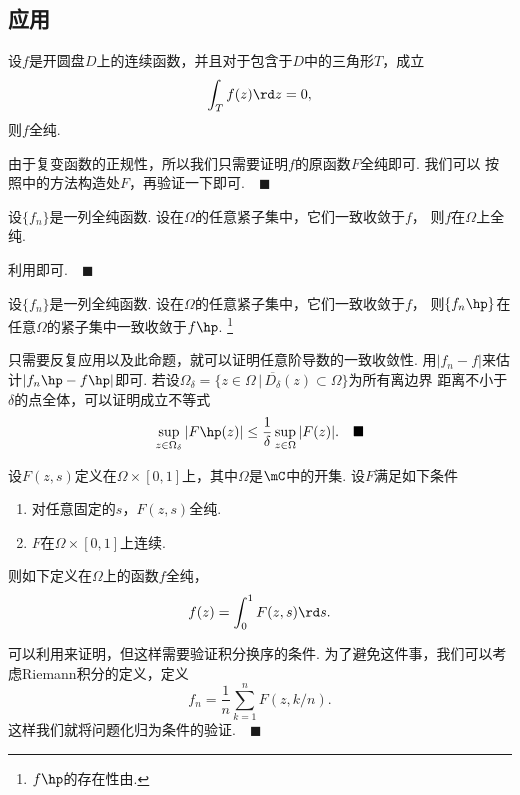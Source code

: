 \subsection{应用}

  \begin{thm}[Morera]
    \label{thm: Morera}
    设$f$是开圆盘$D$上的连续函数，并且对于包含于$D$中的三角形$T$，成立
    \[
      \int_T f(z)\rd z = 0,
    \]
    则$f$全纯.
  \end{thm}
  \proof
    由于复变函数的正规性，所以我们只需要证明$f$的原函数$F$全纯即可. 我们可以
    按照中的方法构造处$F$，再验证一下即可.$\quad\blacksquare$

  \begin{thm}[级数]
    \label{thm: 级数、全纯}
    设$\{f_n\}$是一列全纯函数. 设在$\Omega$的任意紧子集中，它们一致收敛于$f$，
    则$f$在$\Omega$上全纯.
  \end{thm}
  \proof
    利用即可.$\quad\blacksquare$

  \begin{thm}
    设$\{f_n\}$是一列全纯函数. 设在$\Omega$的任意紧子集中，它们一致收敛于$f$，
    则$\{f_n\hp\}$在任意$\Omega$的紧子集中一致收敛于$f\hp$.
    \footnote{$f\hp$的存在性由.}
  \end{thm}
  \remark
    只需要反复应用以及此命题，就可以证明任意阶导数的一致收敛性.
  \proof
    用$|f_n-f|$来估计$|f_n\hp-f\hp|$即可. 若设$\Omega_\delta=
    \{z\in\Omega\,|\, \overline{D_\delta}(z)\subset\Omega\}$为所有离边界
    距离不小于$\delta$的点全体，可以证明成立不等式
    \[
      \sup_{z\in\Omega_\delta}|F\hp(z)| \le \frac{1}{\delta}\sup_{z\in\Omega}|F(z)|.
      \quad\blacksquare
    \]

  \begin{thm}[含参积分]
    设$F(z,s)$定义在$\Omega\times[0, 1]$上，其中$\Omega$是$\mC$中的开集.
    设$F$满足如下条件
    \begin{enumerate}
      \item 对任意固定的$s$，$F(z, s)$全纯.
      \item $F$在$\Omega\times[0, 1]$上连续.
    \end{enumerate}
    则如下定义在$\Omega$上的函数$f$全纯，
    \[
      f(z) = \int_0^1F(z,s)\rd s.
    \]
  \end{thm}
  \proof
    可以利用来证明，但这样需要验证积分换序的条件.
    为了避免这件事，我们可以考虑Riemann积分的定义，定义
    \[
      f_n = \frac{1}{n}\sum_{k=1}^nF(z,k/n).
    \]
    这样我们就将问题化归为条件的验证.$\quad\blacksquare$

